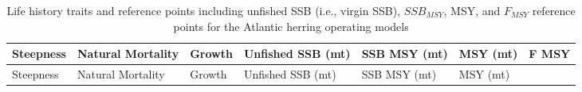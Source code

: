 \documentclass[]{article}
\begin{document}
\begin{longtable}[]{@{}lllllll@{}}
\caption{Life history traits and reference points including unfished SSB
(i.e., virgin SSB), \(SSB_{MSY}\), MSY, and \(F_{MSY}\) reference points
for the Atlantic herring operating models \label{RefPts}}\tabularnewline
\toprule
\begin{minipage}[b]{0.07\columnwidth}\raggedright\strut
Steepness\strut
\end{minipage} & \begin{minipage}[b]{0.07\columnwidth}\raggedright\strut
Natural Mortality\strut
\end{minipage} & \begin{minipage}[b]{0.07\columnwidth}\raggedright\strut
Growth\strut
\end{minipage} & \begin{minipage}[b]{0.07\columnwidth}\raggedright\strut
Unfished SSB (mt)\strut
\end{minipage} & \begin{minipage}[b]{0.07\columnwidth}\raggedright\strut
SSB MSY (mt)\strut
\end{minipage} & \begin{minipage}[b]{0.07\columnwidth}\raggedright\strut
MSY (mt)\strut
\end{minipage} & \begin{minipage}[b]{0.07\columnwidth}\raggedright\strut
F MSY\strut
\end{minipage}\tabularnewline
\midrule
\endfirsthead
\toprule
\begin{minipage}[b]{0.07\columnwidth}\raggedright\strut
Steepness\strut
\end{minipage} & \begin{minipage}[b]{0.07\columnwidth}\raggedright\strut
Natural Mortality\strut
\end{minipage} & \begin{minipage}[b]{0.07\columnwidth}\raggedright\strut
Growth\strut
\end{minipage} & \begin{minipage}[b]{0.07\columnwidth}\raggedright\strut
Unfished SSB (mt)\strut
\end{minipage} & \begin{minipage}[b]{0.07\columnwidth}\raggedright\strut
SSB MSY (mt)\strut
\end{minipage} & \begin{minipage}[b]{0.07\columnwidth}\raggedright\strut
MSY (mt)\strut
\end{minipage} & \begin{minipage}[b]{0.07\columnwidth}\raggedright\strut

\end{minipage}
\end{longtable}
\end{document}
